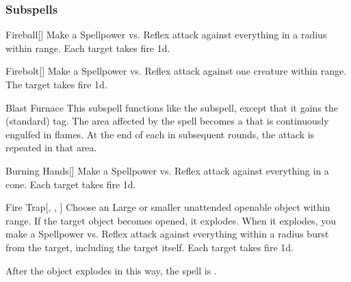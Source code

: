 \subsubsection{Subspells}


\begin{ability}[\nth{1}]{Fireball}[]
Make a Spellpower vs. Reflex attack against everything in a \areasmall radius within \rngclose range.
\hit Each target takes fire  \minus1d.
\end{ability}
\vspace{0.25em}


\begin{ability}[\nth{1}]{Firebolt}[]
Make a Spellpower vs. Reflex attack against one creature within \rngmed range.
\hit The target takes fire  \plus1d.
\end{ability}
\vspace{0.25em}


\begin{ability}[\nth{2}]{Blast Furnace}
This subspell functions like the  subspell, except that it gains the  (standard) tag.
The area affected by the spell becomes a  that is continuously engulfed in flames.
At the end of each  in subsequent rounds, the attack is repeated in that area.
\end{ability}
\vspace{0.25em}


\begin{ability}[\nth{2}]{Burning Hands}[]
Make a Spellpower vs. Reflex attack against everything in a \arealarge cone.
\hit Each target takes fire  \minus1d.
\end{ability}
\vspace{0.25em}


\begin{ability}[\nth{3}]{Fire Trap}[, , ]
Choose an Large or smaller unattended openable object within \rngclose range.
If the target object becomes opened, it explodes.
When it explodes, you make a Spellpower vs. Reflex attack against everything within a \areamed radius burst from the target, including the target itself.
\hit Each target takes fire  \minus1d.

After the object explodes in this way, the spell is .
\end{ability}
\vspace{0.25em}



